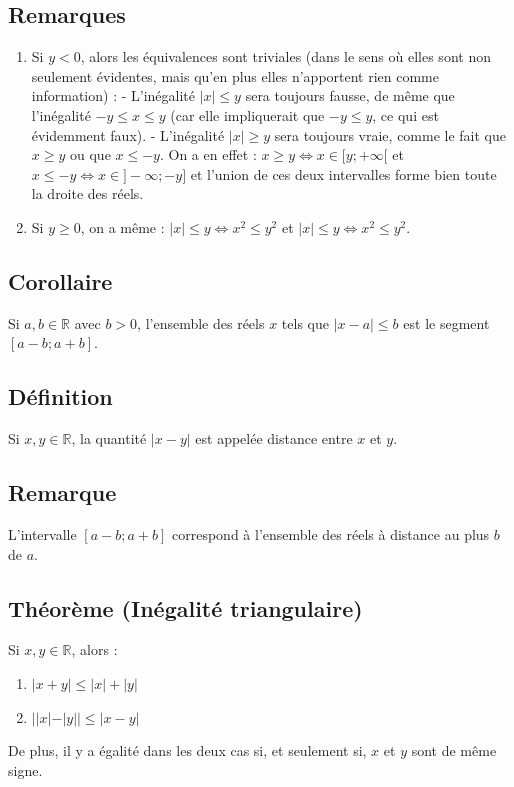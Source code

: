 \documentclass{article}
\begin{document}
		\subsection{Remarques }
		\begin{enumerate}
			\item Si $y < 0$, alors les équivalences sont triviales (dans le sens où elles sont non seulement évidentes, mais qu'en plus elles n'apportent rien comme information) :
			- L'inégalité $|x| \leq y$ sera toujours fausse, de même que l'inégalité $-y \leq x \leq y$ (car elle impliquerait que $-y \leq y$, ce qui est évidemment faux).
			- L'inégalité $|x| \geq y$ sera toujours vraie, comme le fait que $x \geq y$ ou que $x \leq -y$. On a en effet : $x \geq y \Leftrightarrow x \in [y;+\infty[$ et $x \leq -y \Leftrightarrow x \in] -\infty; -y]$ et l'union de ces deux intervalles forme bien toute la droite des réels.
			\item Si $y \geq 0$, on a même : $|x| \leq y \Leftrightarrow x^2 \leq y^2$ et $|x| \leq y \Leftrightarrow x^2 \leq y^2$.
		\end{enumerate}
		
		\subsection{Corollaire}
		Si $a, b \in \mathbb{R}$ avec $b > 0$, l'ensemble des réels $x$ tels que $|x - a| \leq b$ est le segment $[a - b; a + b]$.
		
		\subsection{Définition}
		Si $x, y \in \mathbb{R}$, la quantité $|x - y|$ est appelée distance entre $x$ et $y$.
		
		\subsection{Remarque }
		L'intervalle $[a - b; a + b]$ correspond à l'ensemble des réels à distance au plus $b$ de $a$.
		
		\subsection{Théorème (Inégalité triangulaire)}
		Si $x, y \in \mathbb{R}$, alors :
		\begin{enumerate}
			\item $|x + y| \leq |x| + |y|$
			\item $||x| - |y|| \leq |x - y|$
		\end{enumerate}
		De plus, il y a égalité dans les deux cas si, et seulement si, $x$ et $y$ sont de même signe.
		
\end{document}
